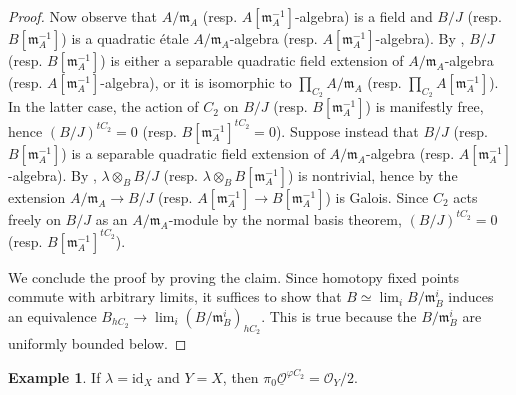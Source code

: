 \documentclass{article}
\theoremstyle{definition}
\newtheorem{example}[theorem]{Example}
\newcommand{\Lucy}[1]{\todo[color=cyan!30]{\footnotesize L: #1}}
\begin{document}
\begin{proof}
    Now observe that $ A/\mathfrak{m}_A $ (resp. $ A[\mathfrak{m}_A^{-1}] $-algebra) is a field and $ B/J $ (resp. $ B[\mathfrak{m}_A^{-1}] $) is a quadratic étale $ A/\mathfrak{m}_A $-algebra (resp. $ A[\mathfrak{m}_A^{-1}] $-algebra). 
    By \cite[Proposition 3.4(ii)]{azumaya_involution}, $ B/J $ (resp. $ B[\mathfrak{m}_A^{-1}] $) is either a separable quadratic field extension of $ A/\mathfrak{m}_A $-algebra (resp. $ A[\mathfrak{m}_A^{-1}] $-algebra), or it is isomorphic to $ \prod_{C_2} A/\mathfrak{m}_A $ (resp. $ \prod_{C_2} A[\mathfrak{m}_A^{-1}] $). 
    In the latter case, the action of $ C_2 $ on $ B/J $ (resp. $ B[\mathfrak{m}_A^{-1}] $) is manifestly free, hence $ (B/J)^{tC_2} = 0 $ (resp. $ B[\mathfrak{m}_A^{-1}]^{tC_2} = 0 $). 
    Suppose instead that $ B/J $ (resp. $ B[\mathfrak{m}_A^{-1}] $) is a separable quadratic field extension of $ A/\mathfrak{m}_A $-algebra (resp. $ A[\mathfrak{m}_A^{-1}] $-algebra). 
    By \cite[Proposition 3.4(ii)]{azumaya_involution}, $ \lambda \otimes_{B} B/J $ (resp. $ \lambda \otimes_B B[\mathfrak{m}_A^{-1}] $) is nontrivial, hence by \cite[Lemma 9.21.2, Tag 09DU]{stacks} the extension $ A/\mathfrak{m}_A \to B/J $ (resp. $ A[\mathfrak{m}_A^{-1}] \to B[\mathfrak{m}_A^{-1}] $) is Galois. 
    Since $ C_2 $ acts freely on $ B/J $ as an $ A/\mathfrak{m}_A $-module by the normal basis theorem, $ (B/J)^{tC_2} = 0 $ (resp. $ B[\mathfrak{m}_A^{-1}]^{tC_2} $).

    We conclude the proof by proving the claim. 
    Since homotopy fixed points commute with arbitrary limits, it suffices to show that $ B \simeq \lim_i B/\mathfrak{m}_B^i $ induces an equivalence $ B_{hC_2} \to \lim_i \left(B/\mathfrak{m}_B^i\right)_{hC_2} $. 
    This is true because the $ B/\mathfrak{m}_B^i $ are uniformly bounded below. \Lucy{compare \cite[Remark 2.8]{MR4280864}.}      
\end{proof}  
\begin{example}
    If $ \lambda = \mathrm{id}_X $ and $ Y = X $, then $ \pi_0 \underline{\mathcal{O}}^{\varphi C_2} = \mathcal{O}_Y /2 $. 
\end{example}

\printbibliography
\end{document}
